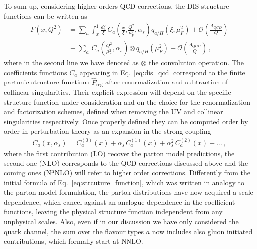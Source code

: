 %
To sum up, considering higher orders QCD corrections, the DIS structure functions can be written
as
\begin{align}
    \label{eq:dis_qcd}
    F\left(x,Q^2\right) &= 
    \sum_a \int_x^1\frac{d\xi}{\xi}\,C_a\left(\frac{x}{\xi},\frac{Q^2}{\mu_F^2}, \alpha_s\right)q_{a/H}\left(\xi,\mu_F^2\right)
    +\mathcal{O}\left(\frac{\Lambda_{QCD}}{Q}\right) \nonumber\\
    & \equiv \sum_a \,C_a\left(\frac{Q^2}{\mu_F^2}, \alpha_s\right) \otimes q_{a/H}\left(\mu_F^2\right)
    +\mathcal{O}\left(\frac{\Lambda_{QCD}}{Q}\right)\,,
\end{align}
where in the second line we have denoted as $\otimes$ the convolution operation.
The coefficients functions $C_a$ appearing in Eq.~\eqref{eq:dis_qcd} correspond to the finite partonic structure 
functions $\hat{F}_{\text{reg}}$ after renormalization and subtraction of collinear singularities.
Their explicit expression will depend on the specific structure function under consideration
and on the choice for the renormalization and factorization schemes, defined when removing the UV and collinear
singularities respectively. 
Once properly defined they can be computed order by order in perturbation theory as an expansion in the strong coupling
\begin{align}
    \label{eq:coeff_functions_expansion}
    C_a\left(x, \alpha_s\right) = C_a^{(0)}\left(x\right) + \alpha_s\, C_a^{(1)}\left(x\right) 
    + \alpha_s^2\, C_a^{(2)}\left(x\right) + ...\,,
\end{align}
where the first contribution (LO) recover the parton model predictions, the second one (NLO) corresponds to the QCD
corrections discussed above and the coming ones (N$^{\text{n}}$NLO) will refer to higher order corrections.
Differently from the initial formula of Eq.~\eqref{eq:strcuture_function}, which was written in analogy to
the parton model formulation, the parton distributions
have now acquired a scale dependence, which cancel against an analogue dependence in the coefficient functions,
leaving the physical structure function independent from any unphysical scales. Also, even if in our 
discussion we have only considered the quark channel, the sum over the flavour types $a$ now includes
also gluon initiated contributions, which formally start at NNLO.


